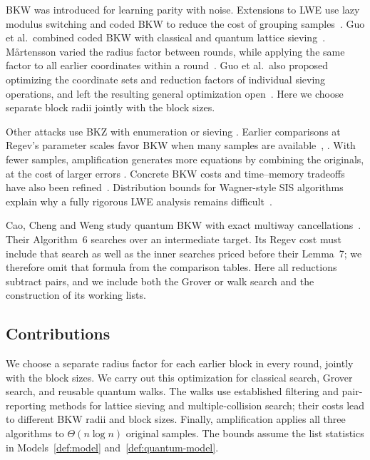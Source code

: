 \documentclass[runningheads,envcountsame,envcountsect,orivec]{llncs}
\begin{document}
BKW was introduced for learning parity with noise. Extensions
to LWE use lazy modulus switching and coded BKW to reduce the
cost of grouping samples~\cite{ACFFP15,AFFP14,GJS15,KF15,HKM18}.
Guo et al.\ combined coded BKW with classical and quantum lattice
sieving~\cite{GJMS17,GJMS19}. M{\aa}rtensson varied the radius
factor between rounds, while applying the same factor to all
earlier coordinates within a round~\cite{M19}.
Guo et al.\ also proposed optimizing the coordinate sets and
reduction factors of individual sieving operations, and left
the resulting general optimization open~\cite[Section~VIII-F]{GJMS19}.
Here we choose separate block radii jointly with the block sizes.

Other attacks use BKZ with enumeration or sieving
\cite{APS15,BDGL16}. Earlier comparisons at Regev's
parameter scales favor BKW when many samples are
available~\cite[Section~6.3]{GJMS17}, \cite[Section~VI]{M19}.
With fewer samples, amplification generates more equations by
combining the originals, at the cost of larger errors
\cite[Section~7.3]{HKM18}. Concrete BKW costs and time--memory
tradeoffs have also been refined~\cite{BGJMW21,WBLW25}.
Distribution bounds for Wagner-style SIS algorithms explain
why a fully rigorous LWE analysis remains
difficult~\cite[Section~4.3]{DEL25}.

Cao, Cheng and Weng study quantum BKW with exact multiway
cancellations~\cite{CCW24}. Their Algorithm~6 searches over an
intermediate target. Its Regev cost must include that search
as well as the inner searches priced before their Lemma~7;
we therefore omit that formula from the comparison tables.
Here all reductions subtract pairs, and we include both the
Grover or walk search and the construction of its working lists.

\subsection{Contributions}
\label{sec:contributions}

We choose a separate radius factor for each earlier block in
every round, jointly with the block sizes. We carry out this
optimization for classical search, Grover search, and reusable
quantum walks. The walks use established filtering and pair-reporting
methods for lattice sieving and multiple-collision search; their
costs lead to different BKW radii and block sizes. Finally, amplification applies all three
algorithms to $\Theta(n\log n)$ original samples.
The bounds assume the list statistics in
Models~\ref{def:model} and~\ref{def:quantum-model}.
\end{document}
